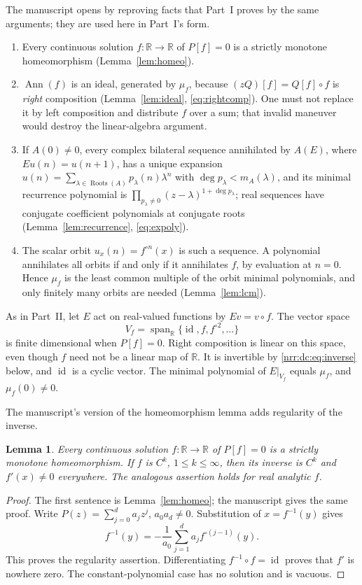 \documentclass[11pt,letterpaper]{article}
\newtheorem{lemma}[theorem]{Lemma}
\theoremstyle{definition}
\theoremstyle{remark}
\newcommand{\R}{\mathbb R}
\newcommand{\id}{\operatorname{id}}
\newcommand{\Ann}{\operatorname{Ann}}
\newcommand{\roots}{\operatorname{Roots}}
\begin{document}
The manuscript opens by reproving facts that Part~I proves by the same
arguments; they are used here in Part~I's form.
\begin{enumerate}[label=\textnormal{(\arabic*)},leftmargin=2.2em]
\item Every continuous solution $f:\R\to\R$ of $P[f]=0$ is a strictly
monotone homeomorphism (Lemma~\ref{lem:homeo}).
\item $\Ann(f)$ is an ideal, generated by $\mu_f$, because
$(zQ)[f]=Q[f]\circ f$ is \emph{right} composition
(Lemma~\ref{lem:ideal}, \eqref{eq:rightcomp}). One must not replace it by left
composition and distribute $f$ over a sum; that invalid maneuver would destroy
the linear-algebra argument.
\item If $A(0)\ne0$, every complex bilateral sequence annihilated by $A(E)$,
where $Eu(n)=u(n+1)$, has a unique expansion
$u(n)=\sum_{\lambda\in\roots(A)}p_\lambda(n)\lambda^n$ with
$\deg p_\lambda<m_A(\lambda)$, and its minimal recurrence polynomial is
$\prod_{p_\lambda\ne0}(z-\lambda)^{1+\deg p_\lambda}$; real sequences have
conjugate coefficient polynomials at conjugate roots
(Lemma~\ref{lem:recurrence}, \eqref{eq:expoly}).
\item The scalar orbit $u_x(n)=f^{\circ n}(x)$ is such a sequence. A
polynomial annihilates all orbits if and only if it annihilates $f$, by
evaluation at $n=0$. Hence $\mu_f$ is the least common multiple of the orbit
minimal polynomials, and only finitely many orbits are needed
(Lemma~\ref{lem:lcm}).
\end{enumerate}
As in Part~II, let $E$ act on real-valued functions by $Ev=v\circ f$. The
vector space
\[
 V_f=\operatorname{span}_{\R}\{\id,f,f^{\circ2},\ldots\}
\]
is finite dimensional when $P[f]=0$. Right composition is linear on this
space, even though $f$ need not be a linear map of $\R$. It is invertible by
\eqref{nrr:dc:eq:inverse} below, and $\id$ is a cyclic vector. The minimal
polynomial of $E|_{V_f}$ equals $\mu_f$, and $\mu_f(0)\ne0$.

The manuscript's version of the homeomorphism lemma adds regularity of the
inverse.

\begin{lemma}
\label{nrr:dc:lem:homeomorphism}
Every continuous solution $f:\R\to\R$ of $P[f]=0$ is a strictly monotone
homeomorphism. If $f$ is $C^k$, $1\le k\le\infty$, then its inverse is
$C^k$ and $f'(x)\ne0$ everywhere. The analogous assertion holds for real
analytic $f$.
\end{lemma}
\begin{proof}
The first sentence is Lemma~\ref{lem:homeo}; the manuscript gives the same
proof. Write $P(z)=\sum_{j=0}^d a_jz^j$, $a_0a_d\ne0$.
Substitution of $x=f^{-1}(y)$ gives
\begin{equation}
 f^{-1}(y)=-\frac1{a_0}\sum_{j=1}^d a_j f^{\circ(j-1)}(y).
 \label{nrr:dc:eq:inverse}
\end{equation}
This proves the regularity assertion. Differentiating
$f^{-1}\circ f=\id$ proves that $f'$ is nowhere zero.
The constant-polynomial case has no solution and is vacuous.
\end{proof}
\end{document}
